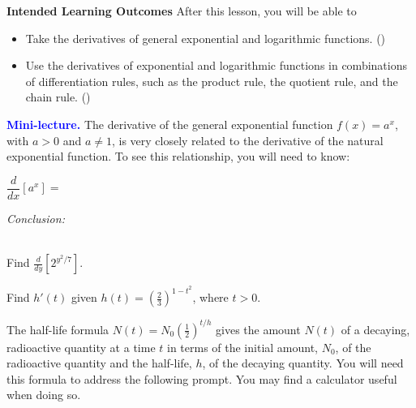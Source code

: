 \documentclass[10pt]{article}
\begin{document}
\pagestyle{otherpages}
\thispagestyle{firstpage}

\textbf{Intended Learning Outcomes}
After this lesson, you will be able to 

\begin{itemize}
    \item Take the derivatives of general exponential and logarithmic functions. ()
    \item Use the derivatives of exponential and logarithmic functions in combinations of differentiation rules, such as the product rule, the quotient rule, and the chain rule. ()
\end{itemize}

\vspace{-0.5cm}

\hrulefill




\reversemarginpar{} 
{\bf \textcolor{blue}{Mini-lecture.}} The derivative of the general exponential function $f(x)=a^x$, with $a>0$ and $a\neq1$, is very closely related to the derivative of the natural exponential function. To see this relationship, you will need to know:

$\dfrac{d}{dx}[a^x] =$

\vspace{2.5in}
{\em Conclusion:}

~\\

 Find $\displaystyle\frac{d}{dy}\left[2^{y^2/7}\right]$.

\vfill

 Find $h'(t)$ given $h(t)=\left(\displaystyle\frac23\right)^{1-t^2}$, where $t>0$.

\vfill

\newpage%

 The half-life formula $\displaystyle N(t) = N_0\left(\frac12\right)^{t/h}$ gives the amount $N(t)$ of a decaying, radioactive quantity at a time $t$ in terms of the initial amount, $N_0$, of the radioactive quantity and the half-life, $h$, of the decaying quantity. You will need this formula to address the following prompt. You may find a calculator useful when doing so.\\
\end{document}
